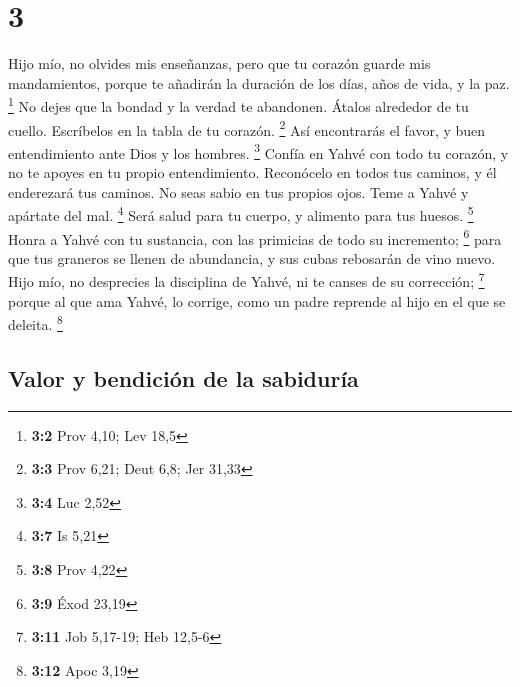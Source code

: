\hypertarget{section-2}{%
\section{3}\label{section-2}}

 Hijo mío, no olvides mis enseñanzas, pero que tu corazón
guarde mis mandamientos,  porque te añadirán la duración
de los días, años de vida, y la paz. \footnote{\textbf{3:2} Prov 4,10;
  Lev 18,5}  No dejes que la bondad y la verdad te
abandonen. Átalos alrededor de tu cuello. Escríbelos en la tabla de tu
corazón. \footnote{\textbf{3:3} Prov 6,21; Deut 6,8; Jer 31,33}
 Así encontrarás el favor, y buen entendimiento ante Dios
y los hombres. \footnote{\textbf{3:4} Luc 2,52}  Confía en
Yahvé con todo tu corazón, y no te apoyes en tu propio entendimiento.
 Reconócelo en todos tus caminos, y él enderezará tus
caminos.  No seas sabio en tus propios ojos. Teme a Yahvé
y apártate del mal. \footnote{\textbf{3:7} Is 5,21}  Será
salud para tu cuerpo, y alimento para tus huesos. \footnote{\textbf{3:8}
  Prov 4,22}  Honra a Yahvé con tu sustancia, con las
primicias de todo su incremento; \footnote{\textbf{3:9} Éxod 23,19}
 para que tus graneros se llenen de abundancia, y sus
cubas rebosarán de vino nuevo.  Hijo mío, no desprecies
la disciplina de Yahvé, ni te canses de su corrección; \footnote{\textbf{3:11}
  Job 5,17-19; Heb 12,5-6}  porque al que ama Yahvé, lo
corrige, como un padre reprende al hijo en el que se deleita.
\footnote{\textbf{3:12} Apoc 3,19}

\hypertarget{valor-y-bendiciuxf3n-de-la-sabiduruxeda}{%
\subsection{Valor y bendición de la
sabiduría}\label{valor-y-bendiciuxf3n-de-la-sabiduruxeda}}

